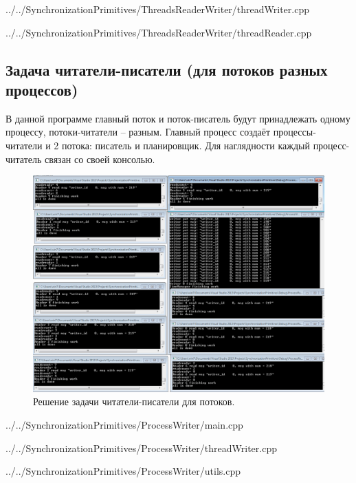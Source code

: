 \documentclass[a4paper, 12pt]{article}		%
\begin{document}

{../../SynchronizationPrimitives/ThreadsReaderWriter/threadWriter.cpp}


{../../SynchronizationPrimitives/ThreadsReaderWriter/threadReader.cpp}

\newpage
\subsection{Задача читатели-писатели (для потоков разных процессов)}

В данной программе главный поток и поток-писатель будут принадлежать одному процессу, потоки-читатели – разным. Главный процесс создаёт процессы-читатели и 2 потока: писатель и планировщик. Для наглядности каждый процесс-читатель связан со своей консолью.

\begin{figure}[h!]
\centering
\includegraphics[scale=0.50]{res/007}
\caption{Решение задачи читатели-писатели для потоков.}
\end{figure}


{../../SynchronizationPrimitives/ProcessWriter/main.cpp}


{../../SynchronizationPrimitives/ProcessWriter/threadWriter.cpp}


{../../SynchronizationPrimitives/ProcessWriter/utils.cpp}
\end{document}
